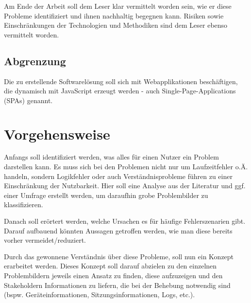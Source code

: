 Am Ende der Arbeit soll dem Leser klar vermittelt worden sein, wie er diese Probleme identifiziert und ihnen nachhaltig begegnen kann. Risiken sowie Einschränkungen der Technologien und Methodiken sind dem Leser ebenso vermittelt worden.

\subsection{Abgrenzung}

Die zu erstellende Softwarelösung soll sich mit Webapplikationen beschäftigen, die dynamisch mit JavaScript erzeugt werden - auch Single-Page-Applications (SPAs) genannt. 

%

\section{Vorgehensweise}

Anfangs soll identifiziert werden, was alles für einen Nutzer ein Problem darstellen kann. Es muss sich bei den Problemen nicht nur um Laufzeitfehler o.Ä. handeln, sondern Logikfehler oder auch Verständnisprobleme führen zu einer Einschränkung der Nutzbarkeit. Hier soll eine Analyse aus der Literatur und ggf. einer Umfrage erstellt werden, um daraufhin grobe Problembilder zu klassifizieren.

Danach soll erörtert werden, welche Ursachen es für häufige Fehlerszenarien gibt. Darauf aufbauend könnten Aussagen getroffen werden, wie man diese bereits vorher vermeidet/reduziert.

Durch das gewonnene Verständnis über diese Probleme, soll nun ein Konzept erarbeitet werden. Dieses Konzept soll darauf abzielen zu den einzelnen Problembildern jeweils einen Ansatz zu finden, diese aufzuzeigen und den Stakeholdern Informationen zu liefern, die bei der Behebung notwendig sind (bspw. Geräteinformationen, Sitzungsinformationen, Logs, etc.).

